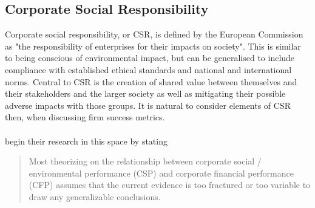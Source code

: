\subsection{Corporate Social Responsibility}
{Corporate social responsibility, or CSR, is defined by the European Commission as "the responsibility of enterprises for their impacts on society". This is similar to being conscious of environmental impact, but can be generalised to include compliance with established ethical standards and national and international norms. Central to CSR is the creation of shared value between themselves and their stakeholders and the larger society as well as mitigating their possible adverse impacts with those groups. It is natural to consider elements of CSR then, when discussing firm success metrics. \\\\
\cite{orlitzky2003corporate} begin their research in this space by stating 
\begin{quote}
Most theorizing on the relationship between corporate social / environmental performance (CSP) and corporate financial performance (CFP) assumes that the current evidence is too fractured or too variable to draw any generalizable conclusions.


\end{quote}}
